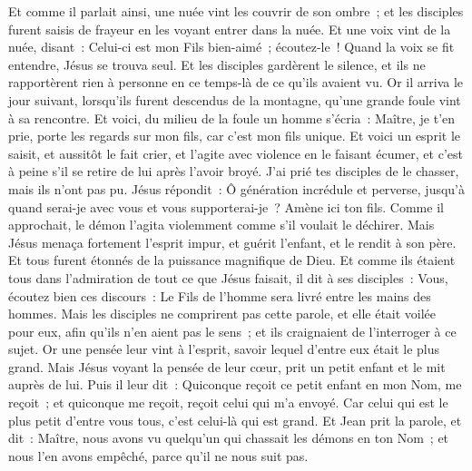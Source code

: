 \begin{multicols}{2}
Et comme il parlait ainsi, une nuée vint les couvrir de son ombre~; et les disciples furent saisis de frayeur en les voyant entrer dans la nuée.
Et une voix vint de la nuée, disant~: Celui-ci est mon Fils bien-aimé~; écoutez-le~!
Quand la voix se fit entendre, Jésus se trouva seul. Et les disciples gardèrent le silence, et ils ne rapportèrent rien à personne en ce temps-là de ce qu'ils avaient vu.
Or il arriva le jour suivant, lorsqu'ils furent descendus de la montagne, qu'une grande foule vint à sa rencontre.
Et voici, du milieu de la foule un homme s'écria~: Maître, je t'en prie, porte les regards sur mon fils, car c'est mon fils unique.
Et voici un esprit le saisit, et aussitôt le fait crier, et l'agite avec violence en le faisant écumer, et c'est à peine s'il se retire de lui après l'avoir broyé.
J'ai prié tes disciples de le chasser, mais ils n'ont pas pu.
Jésus répondit~: Ô génération incrédule et perverse, jusqu'à quand serai-je avec vous et vous supporterai-je~? Amène ici ton fils.
Comme il approchait, le démon l'agita violemment comme s'il voulait le déchirer. Mais Jésus menaça fortement l'esprit impur, et guérit l'enfant, et le rendit à son père.
Et tous furent étonnés de la puissance magnifique de Dieu. Et comme ils étaient tous dans l'admiration de tout ce que Jésus faisait, il dit à ses disciples~:
Vous, écoutez bien ces discours~: Le Fils de l'homme sera livré entre les mains des hommes.
Mais les disciples ne comprirent pas cette parole, et elle était voilée pour eux, afin qu'ils n'en aient pas le sens~; et ils craignaient de l'interroger à ce sujet.
Or une pensée leur vint à l'esprit, savoir lequel d'entre eux était le plus grand.
Mais Jésus voyant la pensée de leur cœur, prit un petit enfant et le mit auprès de lui.
Puis il leur dit~: Quiconque reçoit ce petit enfant en mon Nom, me reçoit~; et quiconque me reçoit, reçoit celui qui m'a envoyé. Car celui qui est le plus petit d'entre vous tous, c'est celui-là qui est grand.
Et Jean prit la parole, et dit~: Maître, nous avons vu quelqu'un qui chassait les démons en ton Nom~; et nous l'en avons empêché, parce qu'il ne nous suit pas.

\end{multicols}

